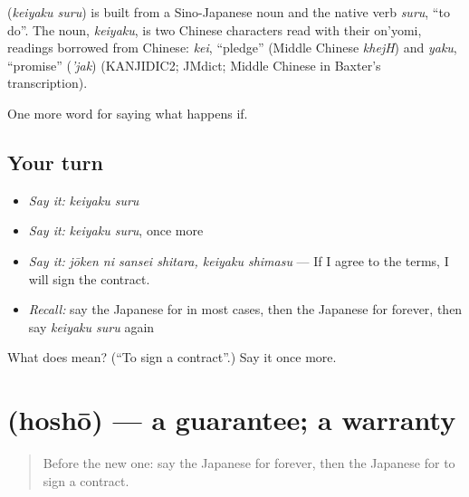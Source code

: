 \begin{cousinweb}
\textbf{} (\emph{keiyaku suru}) is built from a Sino-Japanese noun and the native verb \emph{suru}, \textquotedblleft{}to do\textquotedblright{}. The noun, \emph{keiyaku}, is two Chinese characters read with their on'yomi, readings borrowed from Chinese: \emph{kei}, \textquotedblleft{}pledge\textquotedblright{} (Middle Chinese \emph{khejH}) and \emph{yaku}, \textquotedblleft{}promise\textquotedblright{} (\emph{'jak}) (KANJIDIC2; JMdict; Middle Chinese in Baxter's transcription).
\end{cousinweb}

\begin{grammarlens}[title={What you've built}]
One more word for saying what happens if.
\end{grammarlens}

\subsection*{Your turn}
\begin{itemize}
\raggedright
  \item \emph{Say it:} \emph{keiyaku suru}
  \item \emph{Say it:} \emph{keiyaku suru}, once more
  \item \emph{Say it:} \emph{jōken ni sansei shitara, keiyaku shimasu} — If I agree to the terms, I will sign the contract.
  \item \emph{Recall:} say the Japanese for in most cases, then the Japanese for forever, then say \emph{keiyaku suru} again
\end{itemize}

\begin{tcolorbox}[breakable,colback=teal!4,colframe=teal!35!black,title={Before you move on}]
What does  mean? (\textquotedblleft{}To sign a contract\textquotedblright{}.) Say it once more.
\end{tcolorbox}
\section[\texorpdfstring{\ja{ほしょう} (hoshō)}{ほしょう (hoshō)}]{ (hoshō) — a guarantee; a warranty}

\label{lesson:JA-C357-hoshou}



\begin{quote}
Before the new one: say the Japanese for forever, then the Japanese for to sign a contract.
\end{quote}

